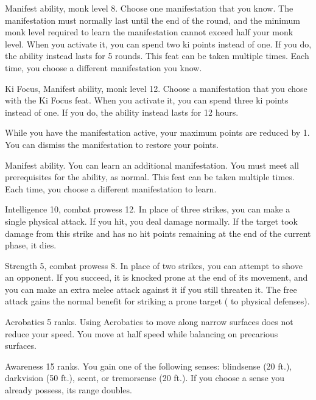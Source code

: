 \featpre Manifest \ki ability, monk level 8.
\featben Choose one \ki manifestation that you know.
The manifestation must normally last until the end of the round, and the minimum monk level required to learn the manifestation cannot exceed half your monk level.
When you activate it, you can spend two ki points instead of one.
If you do, the ability instead lasts for 5 rounds.
 This feat can be taken multiple times.
Each time, you choose a different \ki manifestation you know.

\featpre Ki Focus, Manifest \ki ability, monk level 12.
\featben Choose a \ki manifestation that you chose with the Ki Focus feat.
When you activate it, you can spend three ki points instead of one.
If you do, the ability instead lasts for 12 hours.

While you have the manifestation active, your maximum \ki points are reduced by 1.
You can dismiss the manifestation to restore your \ki points.

\featpre Manifest \ki ability.
\featben You can learn an additional \ki manifestation.
You must meet all prerequisites for the ability, as normal.
 This feat can be taken multiple times.
Each time, you choose a different \ki manifestation to learn.

\featpres Intelligence 10, combat prowess 12.
\featben In place of three strikes, you can make a single physical attack.
If you hit, you deal damage normally.
If the target took damage from this strike and has no hit points remaining at the end of the current phase, it dies.

\featpre Strength 5, combat prowess 8.
\featben In place of two strikes, you can attempt to shove an opponent.
If you succeed, it is knocked prone at the end of its movement, and you can make an extra melee attack against it if you still threaten it.
The free attack gains the normal benefit for striking a prone target ( to physical defenses).

\featpre Acrobatics 5 ranks.
\featben Using Acrobatics to move along narrow surfaces does not reduce your speed.
 You move at half speed while balancing on precarious surfaces.

\featpre Awareness 15 ranks.
\featben You gain one of the following senses: blindsense (20 ft.), darkvision (50 ft.), scent, or tremorsense (20 ft.).
If you choose a sense you already possess, its range doubles.

